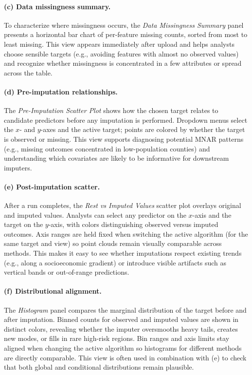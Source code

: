 \documentclass{egpubl}
\begin{document}
\paragraph*{(c) Data missingness summary.}
To characterize where missingness occurs, the \emph{Data Missingness Summary} panel presents a horizontal bar chart of per-feature missing counts, sorted from most to least missing. This view appears immediately after upload and helps analysts choose sensible targets (e.g., avoiding features with almost no observed values) and recognize whether missingness is concentrated in a few attributes or spread across the table.

\paragraph*{(d) Pre-imputation relationships.}
The \emph{Pre-Imputation Scatter Plot} shows how the chosen target relates to candidate predictors before any imputation is performed. Dropdown menus select the $x$- and $y$-axes and the active target; points are colored by whether the target is observed or missing. This view supports diagnosing potential MNAR patterns (e.g., missing outcomes concentrated in low-population counties) and understanding which covariates are likely to be informative for downstream imputers.

\paragraph*{(e) Post-imputation scatter.}
After a run completes, the \emph{Rest vs Imputed Values} scatter plot overlays original and imputed values. Analysts can select any predictor on the $x$-axis and the target on the $y$-axis, with colors distinguishing observed versus imputed outcomes. Axis ranges are held fixed when switching the active algorithm (for the same target and view) so point clouds remain visually comparable across methods. This makes it easy to see whether imputations respect existing trends (e.g., along a socioeconomic gradient) or introduce visible artifacts such as vertical bands or out-of-range predictions.

\paragraph*{(f) Distributional alignment.}
The \emph{Histogram} panel compares the marginal distribution of the target before and after imputation. Binned counts for observed and imputed values are shown in distinct colors, revealing whether the imputer oversmooths heavy tails, creates new modes, or fills in rare high-risk regions. Bin ranges and axis limits stay aligned when changing the active algorithm so histograms for different methods are directly comparable. This view is often used in combination with (e) to check that both global and conditional distributions remain plausible.
\end{document}
